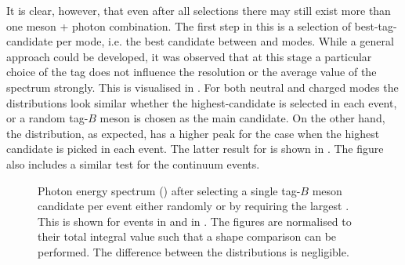 It is clear, however, that even after all selections there may still exist more than one \B meson + photon combination.
The first step in this is a selection of best-tag-candidate per \FEI mode, i.e. the best candidate between \feiBp and \feiBz modes.
While a general approach could be developed, it was observed that at this stage a particular choice of the tag does not influence the resolution or the average value of the spectrum strongly.
This is visualised in .
For both neutral and charged \BtoXsgamma modes the distributions look similar whether the highest-\feiProb candidate is selected in each event, or a random tag-$B$ meson is chosen as the main candidate.
On the other hand, the \Mbc distribution, as expected, has a higher peak for the case when the highest \feiProb candidate is picked in each event.
The latter result for \BtoXsgamma is shown in .
The figure also includes a similar \Mbc test for the continuum events.

\begin{figure}[htbp!]
    \centering
    \caption{\label{fig:same_mode_best_tag_selection}Photon energy spectrum () after selecting a single tag-$B$ meson candidate per event either randomly or by requiring the largest \feiProb.
    This is shown for \BptoXsgamma events in  
    and \BztoXsgamma in .
    The figures are normalised to their total integral value such that a shape comparison can be performed.
    The difference between the distributions is negligible.
    }
\end{figure}

